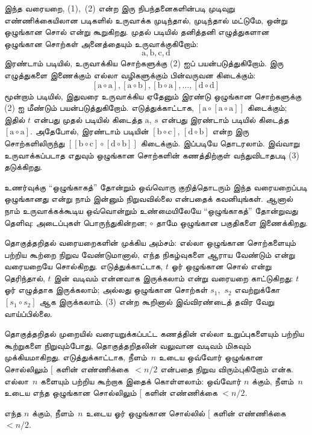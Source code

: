 \documentclass[../../../include/open-logic-section]{subfiles}
\begin{document}
இந்த வரையறை, (1),~(2) என்ற இரு நிபந்தனைகளின்படி
முடிவுறு எண்ணிக்கையிலான படிகளில் உருவாக்க முடிந்தால்,
முடிந்தால் மட்டுமே, ஒன்று ஒழுங்கான சொல் என்று
கூறுகிறது. முதல் படியில் தனித்தனி எழுத்துகளான
ஒழுங்கான சொற்கள் அனைத்தையும் உருவாக்குகிறோம்:
\[
\mathrm{a}, \mathrm{b}, \mathrm{c}, \mathrm{d}
\]
இரண்டாம் படியில், உருவாக்கிய சொற்களுக்கு (2) ஐப்
பயன்படுத்துகிறோம். இரு எழுத்துகளை இணைக்கும்
எல்லா வழிகளுக்கும் பின்வருவன கிடைக்கும்:
\[
[\mathrm{a} \circ \mathrm{a}], [\mathrm{a} \circ \mathrm{b}],
[\mathrm{b} \circ \mathrm{a}], \dots, [\mathrm{d} \circ \mathrm{d}]
\]
மூன்றாம் படியில், இதுவரை உருவாக்கிய ஏதேனும்
இரண்டு ஒழுங்கான சொற்களுக்கு (2) ஐ மீண்டும்
பயன்படுத்துகிறோம். எடுத்துக்காட்டாக,
$[\mathrm{a} \circ [\mathrm{a} \circ
    \mathrm{a}]]$ கிடைக்கும்; இதில் $t$ என்பது
முதல் படியில் கிடைத்த $\mathrm{a}$, $s$
என்பது இரண்டாம் படியில் கிடைத்த
$[\mathrm{a} \circ \mathrm{a}]$. அதேபோல்,
இரண்டாம் படியின் $[\mathrm{b} \circ \mathrm{c}]$,
$[\mathrm{d} \circ \mathrm{b}]$ என்ற இரு
சொற்களிலிருந்து $[[\mathrm{b} \circ
    \mathrm{c}] \circ [\mathrm{d} \circ \mathrm{b}]]$
கிடைக்கும். இப்படியே தொடரலாம். இவ்வாறு
உருவாக்கப்படாத எதுவும் ஒழுங்கான சொற்களின்
கணத்திற்குள் வந்துவிடாதபடி (3) தடுக்கிறது.

உணர்வுக்கு ``ஒழுங்காகத்'' தோன்றும் ஒவ்வொரு
குறித்தொடரும் இந்த வரையறைப்படி ஒழுங்கானது
என்று நாம் இன்னும் நிறுவவில்லை என்பதைக்
கவனியுங்கள். ஆனால் நாம் உருவாக்கக்கூடிய
ஒவ்வொன்றும் உண்மையிலேயே ``ஒழுங்காகத்''
தோன்றுவது தெளிவு: அடைப்புகள் பொருந்துகின்றன;
$\circ$ தாமே ஒழுங்கான பகுதிகளை இணைக்கிறது.

தொகுத்தறிதல் வரையறைகளின் முக்கிய அம்சம்:
எல்லா ஒழுங்கான சொற்களையும் பற்றிய கூற்றை
நிறுவ வேண்டுமானால், எந்த நிகழ்வுகளை ஆராய
வேண்டும் என்று வரையறையே சொல்கிறது.
எடுத்துக்காட்டாக, $t$ ஓர் ஒழுங்கான சொல்
என்று தெரிந்தால், $t$ இன் வடிவம் என்னவாக
இருக்கலாம் என்று வரையறை காட்டுகிறது:
$t$ ஓர் எழுத்தாக இருக்கலாம்; அல்லது
ஒழுங்கான சொற்கள் $s_1$,~$s_2$ எவற்றுக்கோ
$[s_1 \circ s_2]$ ஆக இருக்கலாம்.
(3) என்ற கூறினால் இவ்விரண்டைத் தவிர
வேறு வாய்ப்பில்லை.

தொகுத்தறிதல் முறையில் வரையறுக்கப்பட்ட கணத்தின்
எல்லா உறுப்புகளையும் பற்றிய கூற்றுகளை
நிறுவும்போது, தொகுத்தறிதலின் வலுவான வடிவம்
மிகவும் முக்கியமாகிறது. எடுத்துக்காட்டாக,
நீளம்~$n$ உடைய ஒவ்வோர் ஒழுங்கான சொல்லிலும்
$[$ களின் எண்ணிக்கை~$< n/2$ என்பதை
நிறுவ விரும்புகிறோம் என்க. எல்லா~$n$
களையும் பற்றிய கூற்றாக இதைக் கொள்ளலாம்:
ஒவ்வோர் $n$ க்கும், நீளம்~$n$ உடைய
எந்த ஒழுங்கான சொல்லிலும் $[$ களின்
எண்ணிக்கை $< n/2$.

\begin{prop}
  எந்த $n$ க்கும், நீளம்~$n$ உடைய
  ஓர் ஒழுங்கான சொல்லில் $[$ களின்
  எண்ணிக்கை $< n/2$.
\end{prop}
\end{document}

